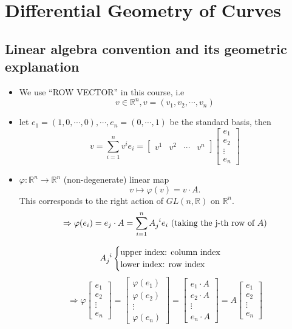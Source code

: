 \chapter{Differential Geometry of Curves}

\section{Linear algebra convention and its geometric explanation}
\begin{itemize}
    \item We use ``ROW VECTOR'' in this course, i.e
    \[v\in \mathbb{R}^n, v=(v_1,v_2,\cdots,v_n)\]
    \item let $e_1=(1,0,\cdots,0),\cdots,e_n=(0,\cdots,1)$ be the standard basis, then 
    \[v=\sum_{i=1}^nv^i e_i=
    \begin{bmatrix}
        v^1& v^2& \cdots & v^n
    \end{bmatrix}
    \begin{bmatrix}
        e_1\\
        e_2\\
        \vdots\\
        e_n
    \end{bmatrix}
    \]
    \item $\varphi\colon \mathbb{R}^n\to \mathbb{R}^n$ (non-degenerate) linear map
    \[v\mapsto \varphi(v)=v\cdot A.\]
    This corresponds to the right action of $GL(n,\mathbb{R})$ on $\mathbb{R}^n$.
    \[\Rightarrow \varphi(e_i)=e_j \cdot A=\sum_{i=1}^n A\indices{_j^i}e_i\text{ (taking the j-th row of }A\text{)}\]
    
    \[A\indices{_j^i}\begin{cases}
        \text{upper index: column index}\\
        \text{lower index: row index}
    \end{cases}\]
    \[\Rightarrow \varphi\begin{bmatrix}
        e_1\\
        e_2\\
        \vdots\\
        e_n
    \end{bmatrix}=\begin{bmatrix}
       \varphi( e_1)\\
        \varphi (e_2)\\
        \vdots\\
        \varphi(e_n)
    \end{bmatrix}=\begin{bmatrix}
        e_1\cdot A\\
        e_2\cdot A\\
        \vdots\\
        e_n\cdot A
    \end{bmatrix}=
    A \begin{bmatrix}
        e_1\\
        e_2\\
        \vdots\\
        e_n
    \end{bmatrix}\]
\end{itemize}

